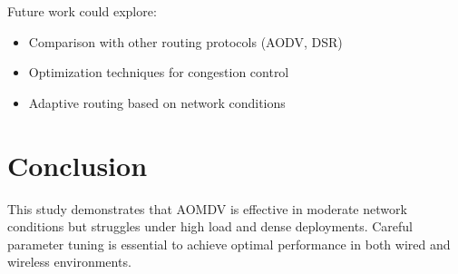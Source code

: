 \documentclass[11pt]{article}
\begin{document}
Future work could explore:

\begin{itemize}
    \item Comparison with other routing protocols (AODV, DSR)
    \item Optimization techniques for congestion control
    \item Adaptive routing based on network conditions
\end{itemize}

\section{Conclusion}

This study demonstrates that AOMDV is effective in moderate network conditions but struggles under high load and dense deployments. Careful parameter tuning is essential to achieve optimal performance in both wired and wireless environments.
\end{document}
